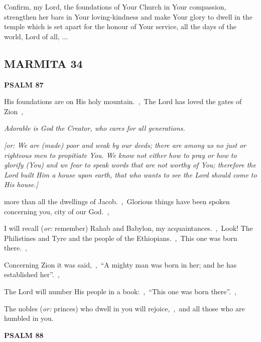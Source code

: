 \documentclass[12pt,twoside,a5paper]{article}
\newcommand{\marmita}[1]{\subsection*{MARMITA {#1}}}
\newcommand{\psalm}[1]{\textbf{PSALM {#1}}\nopagebreak}
\newcommand{\qanona}[1]{{\liturgicalhint{Qanona.} \emph{#1}}}
\newcommand{\slota}[1]{\liturgicalhint{Slota.} #1}
\newcommand{\translationoption}[1]{\emph{or:} #1}
\begin{document}
\slota{Confirm, my Lord, the foundations of Your Church in Your compassion, strengthen her bars in Your loving-kindness and make Your glory to dwell in the temple which is set apart for the honour of Your service, all the days of the world, Lord of all, ...}

\marmita{34}

\psalm{87}

\begin{normalparskip}
  His foundations are on His holy mountain.~\sep\ The Lord has loved the gates of Zion~\sep

  \qanona{Adorable is God the Creator, who cares for all generations.}

  \emph{[\translationoption{We are (made) poor and weak by our deeds; there are among us no just or righteous men to propitiate You. We know not either how to pray or how to glorify (You) and we fear to speak words that are not worthy of You; therefore the Lord built Him a house upon earth, that who wants to see the Lord should come to His house.}]}

  more than all the dwellings of Jacob.~\sep\ Glorious things have been spoken concerning you, city of our God.~\sep

  I will recall (\translationoption{remember}) Rahab and Babylon, my acquaintances.~\sep\ Look! The Philistines and Tyre and the people of the Ethiopians.~\sep\ This one was born there.~\sep

  Concerning Zion it was said,~\sep\ ``A mighty man was born in her; and he has established her''.~\sep

  The Lord will number His people in a book:~\sep\ ``This one was born there''.~\sep

  The nobles (\translationoption{princes}) who dwell in you will rejoice,~\sep\ and all those who are humbled in you.
\end{normalparskip}

\psalm{88}
\end{document}
